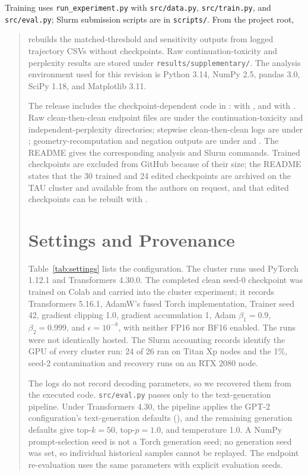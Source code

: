 Training uses \texttt{run\_experiment.py} with \texttt{src/data.py}, \texttt{src/train.py}, and \texttt{src/eval.py}; Slurm submission scripts are in \texttt{scripts/}. From the project root,
\begin{quote}\small\ttfamily
rebuilds the matched-threshold and sensitivity outputs from logged trajectory CSVs without checkpoints. Raw continuation-toxicity and perplexity results are stored under \texttt{results/supplementary/}. The analysis environment used for this revision is Python 3.14, NumPy 2.5, pandas 3.0, SciPy 1.18, and Matplotlib 3.11.

The release includes the checkpoint-dependent code in :  with , and  with . Raw clean-then-clean endpoint files are under the continuation-toxicity and independent-perplexity  directories; stepwise clean-then-clean logs are under ; geometry-recomputation and negation outputs are under  and . The README gives the corresponding analysis and Slurm commands. Trained checkpoints are excluded from GitHub because of their size; the README states that the 30 trained and 24 edited checkpoints are archived on the TAU cluster and available from the authors on request, and that edited checkpoints can be rebuilt with .

\section{Settings and Provenance}
\label{app:settings}
Table~\ref{tab:settings} lists the configuration. The cluster runs used PyTorch 1.12.1 and Transformers 4.30.0. The completed clean seed-0 checkpoint was trained on Colab and carried into the cluster experiment; it records Transformers 5.16.1, AdamW's fused Torch implementation, Trainer seed 42, gradient clipping 1.0, gradient accumulation 1, Adam $\beta_1=0.9$, $\beta_2=0.999$, and $\epsilon=10^{-8}$, with neither FP16 nor BF16 enabled. The runs were not identically hosted. The Slurm accounting records identify the GPU of every cluster run: 24 of 26 ran on Titan Xp nodes and the 1\%, seed-2 contamination and recovery runs on an RTX 2080 node.

The logs do not record decoding parameters, so we recovered them from the executed code. \texttt{src/eval.py} passes only  to the text-generation pipeline. Under Transformers 4.30, the pipeline applies the GPT-2 configuration's text-generation defaults (), and the remaining generation defaults give top-$k=50$, top-$p=1.0$, and temperature 1.0. A NumPy prompt-selection seed is not a Torch generation seed; no generation seed was set, so individual historical samples cannot be replayed. The endpoint re-evaluation uses the same parameters with explicit evaluation seeds.


\end{quote}
